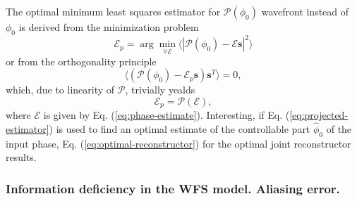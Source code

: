 The optimal minimum least squares estimator for
$\mathcal{P} (\phi_{0})$  wavefront
instead of $\phi_{0}$ is derived from the minimization problem
\begin{equation} \label{eq:projected-estimation}
	\mathcal{E}_{p} = \arg \min_{\forall \mathcal{E}}
	                  \langle |\mathcal{P} (\phi_{0}) -
	                           \mathcal{E} \bm{s}|^{2} \rangle
\end{equation}
or from the orthogonality principle
\begin{equation} \label{eq:projected-estimator-orthogonality-principle}
	\langle (\mathcal{P} (\phi_{0}) -
	         \mathcal{E}_{p} \bm{s}) \bm{s}^{T} \rangle = 0,
\end{equation}
which, due to linearity of $\mathcal{P}$, trivially yealds
\begin{equation} \label{eq:projected-estimator}
	\mathcal{E}_{p} = \mathcal{P(E)},
\end{equation}
where $\mathcal{E}$ is given by Eq. (\ref{eq:phase-estimate}). Interesting,
if Eq. (\ref{eq:projected-estimator}) is used to find an optimal estimate
of the controllable part $\hat{\phi}_{0}$ of the input phase, Eq.
(\ref{eq:optimal-reconstructor}) for the optimal joint reconstructor results.

\subsubsection{Information deficiency in the WFS model. Aliasing error.}

\mbox{}

